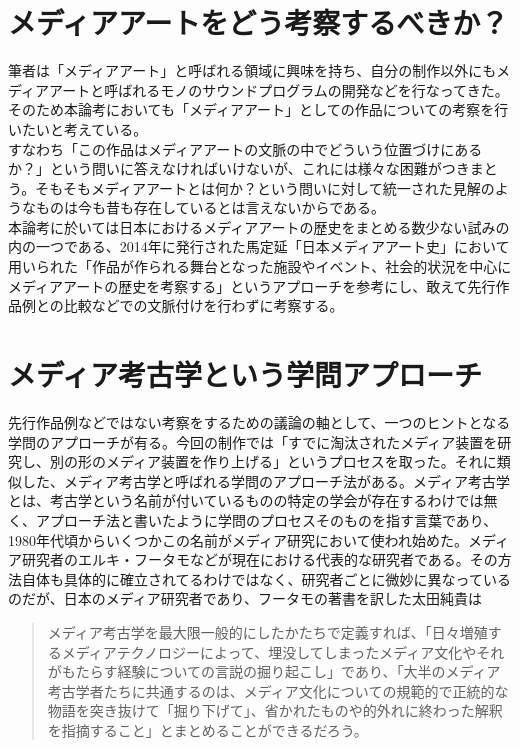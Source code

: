 \section{メディアアートをどう考察するべきか？}\label{ux30e1ux30c7ux30a3ux30a2ux30a2ux30fcux30c8ux3092ux3069ux3046ux8003ux5bdfux3059ux308bux3079ux304dux304b}

筆者は「メディアアート」と呼ばれる領域に興味を持ち、自分の制作以外にもメディアアートと呼ばれるモノのサウンドプログラムの開発などを行なってきた。\\
そのため本論考においても「メディアアート」としての作品についての考察を行いたいと考えている。\\
すなわち「この作品はメディアアートの文脈の中でどういう位置づけにあるか？」という問いに答えなければいけないが、これには様々な困難がつきまとう。そもそもメディアアートとは何か？という問いに対して統一された見解のようなものは今も昔も存在しているとは言えないからである。\\
本論考に於いては日本におけるメディアアートの歴史をまとめる数少ない試みの内の一つである、2014年に発行された馬定延「日本メディアアート史」において用いられた「作品が作られる舞台となった施設やイベント、社会的状況を中心にメディアアートの歴史を考察する」というアプローチを参考にし、敢えて先行作品例との比較などでの文脈付けを行わずに考察する。

\section{メディア考古学という学問アプローチ}\label{ux30e1ux30c7ux30a3ux30a2ux8003ux53e4ux5b66ux3068ux3044ux3046ux5b66ux554fux30a2ux30d7ux30edux30fcux30c1}

先行作品例などではない考察をするための議論の軸として、一つのヒントとなる学問のアプローチが有る。今回の制作では「すでに淘汰されたメディア装置を研究し、別の形のメディア装置を作り上げる」というプロセスを取った。それに類似した、メディア考古学と呼ばれる学問のアプローチ法がある。メディア考古学とは、考古学という名前が付いているものの特定の学会が存在するわけでは無く、アプローチ法と書いたように学問のプロセスそのものを指す言葉であり、1980年代頃からいくつかこの名前がメディア研究において使われ始めた。メディア研究者のエルキ・フータモなどが現在における代表的な研究者である。その方法自体も具体的に確立されてるわけではなく、研究者ごとに微妙に異なっているのだが、日本のメディア研究者であり、フータモの著書を訳した太田純貴は

\begin{quote}
メディア考古学を最大限一般的にしたかたちで定義すれば、「日々増殖するメディアテクノロジーによって、埋没してしまったメディア文化やそれがもたらす経験についての言説の掘り起こし」であり、「大半のメディア考古学者たちに共通するのは、メディア文化についての規範的で正統的な物語を突き抜けて「掘り下げて」、省かれたものや的外れに終わった解釈を指摘すること」とまとめることができるだろう。
\end{quote}

